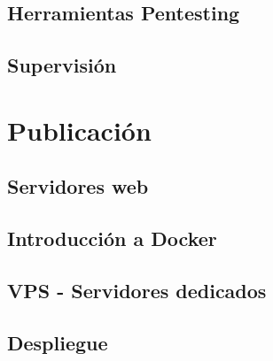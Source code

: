 \subsection{Herramientas Pentesting}
\subsection{Supervisión}

\section{Publicación}
\subsection{Servidores web}
\subsection{Introducción a Docker}
\subsection{VPS - Servidores dedicados}
\subsection{Despliegue}


